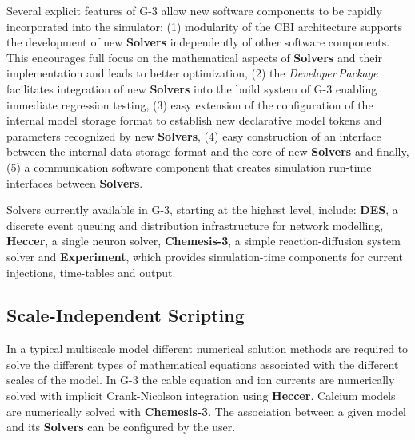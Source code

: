 \documentclass[10pt,letterpaper]{article}
\begin{document}
Several explicit features of G-3 allow new software components to be rapidly incorporated into the simulator: (1) modularity of the CBI architecture supports the development of new {\bf Solvers} independently of other software components. This encourages full focus on the mathematical aspects of {\bf Solvers} and their implementation and leads to better optimization, (2) the {\it Developer\,Package} facilitates integration of new {\bf Solvers} into the build system of G-3 enabling immediate regression testing, (3) easy extension of the configuration of the internal model storage format to establish new declarative model tokens and parameters recognized by new {\bf Solvers}, (4) easy construction of an interface between the internal data storage format and the core of new {\bf Solvers} and finally, (5) a communication software component that creates simulation run-time interfaces between {\bf Solvers}.

Solvers currently available in G-3, starting at the highest level, include: {\bf DES}, a discrete event queuing and distribution infrastructure for network modelling, {\bf Heccer}, a single neuron solver, {\bf Chemesis-3}, a simple reaction-diffusion system solver and {\bf Experiment}, which provides simulation-time components for current injections, time-tables and output.

\subsection*{Scale-Independent Scripting}

In  a typical multiscale model different numerical solution methods are required to solve the different types of mathematical equations associated with the different scales of the model.  In G-3 the cable equation and ion currents are numerically solved with implicit Crank-Nicolson integration using {\bf Heccer}.  Calcium models are numerically solved with {\bf Chemesis-3}. The association between a given model and its {\bf Solvers} can be configured by the user.

\end{document}
